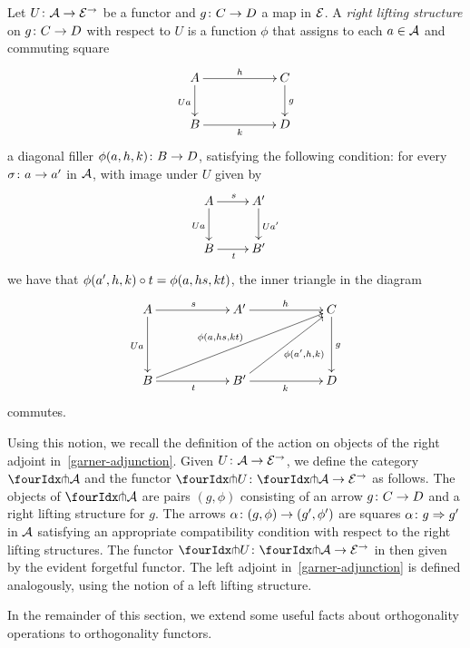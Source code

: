 \documentclass[reqno,10pt,a4paper,oneside]{amsart}
\begin{document}
 
 \begin{definition} Let $U \co \cal{A} \to \catE^\to$ be a functor and $g \co C \to D$ a map in $\catE$. 
 A \emph{right lifting structure} on $g \co C \to D$ with respect to $U$ is 
 a function  $\phi$ that assigns to each $a \in \cal{A}$ and commuting square
\[
\xymatrix@C=2cm{
A \ar[r]^{h}   \ar[d]_{U a} & C \ar[d]^g \\
B \ar[r]_{k} & D}
\]
a diagonal filler $\phi(a, h, k) \co B \to D$, satisfying the following condition: for every $\sigma \co a \to a'$ in $\cal{A}$, 
with image under $U$ given by
\[
\xymatrix{
A \ar[r]^s \ar[d]_{Ua} & A' \ar[d]^{U a'}  \\
B \ar[r]_{t} & B'}
\]
we have that $\phi(a', h, k) \cc t = \phi(a, hs, kt)$, \ie the inner triangle in the diagram
\[
\xymatrix@C=2cm@R=1.5cm{
A \ar[r]^s \ar[d]_{Ua} & A' \ar[r]^{h}  & C \ar[d]^g   \\
B \ar[r]_{t}  \ar[urr]^{\phi(a, hs, k t) \quad } & B'  \ar[r]_k  \ar[ur]_{\phi(a', h, k)} & D }
\]
commutes. 
\end{definition}
 
 Using this notion, we recall the definition of the action on objects of the right adjoint in~\eqref{garner-adjunction}. 
 Given $U \co \cal{A} \to \catE^\to$, we define the category $\liftr{\cal{A}}$ and the functor 
  $\liftr{U} \co \liftr{\cal{A}} \to \catE^\to$ as follows. The objects of
$ \liftr{\cal{A}}$ are pairs $(g, \phi)$ consisting of an arrow $g \co C \to D$ and a right lifting structure for $g$.
The arrows $\alpha \co (g, \phi) \to (g', \phi')$ are squares $\alpha \co g \Rightarrow g'$ in $\cal{A}$ satisfying an appropriate compatibility condition
with respect to the right lifting structures. The functor $\liftr{U} \co \liftr{\cal{A}} \to \catE^\to$ in then given by
the evident forgetful functor. The left adjoint in~\eqref{garner-adjunction} is defined analogously, using the
notion of a left lifting structure.

\medskip

 





\medskip

In the remainder of this section, we extend some useful facts about orthogonality operations to orthogonality functors.
\end{document}
